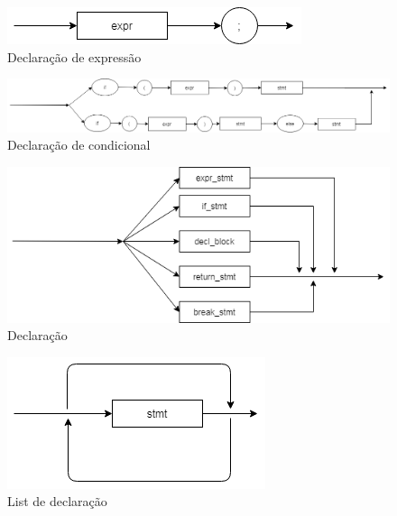 \documentclass[]{article}
\numberwithin{equation}{section}
\begin{document}
\begin{center}
\begin{figure}[h!]
  \includegraphics[width=\linewidth]{./assets/expr_stmt.png}
  \caption{Declaração de expressão}
\end{figure}
\end{center}

\begin{center}
\begin{figure}[h!]
  \includegraphics[width=\linewidth]{./assets/if_stmt.png}
  \caption{Declaração de condicional}
\end{figure}
\end{center}

\begin{center}
\begin{figure}[h!]
  \includegraphics[width=\linewidth]{./assets/stmt.png}
  \caption{Declaração}
\end{figure}
\end{center}

\begin{center}
\begin{figure}[h!]
  \includegraphics[width=\linewidth]{./assets/stmt_list.png}
  \caption{List de declaração}
\end{figure}
\end{center}
\end{document}
